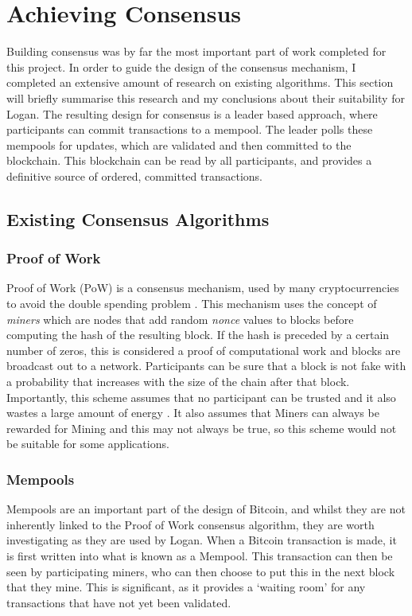 \documentclass[12pt,a4paper,twoside,openright]{report}
\begin{document}
	\section{Achieving Consensus}\label{sec:consensus}
	Building consensus was by far the most important part of work completed for this project. 
	In order to guide the design of the consensus mechanism, I completed an extensive amount of research on existing algorithms.
	This section will briefly summarise this research and my conclusions about their suitability for Logan. 
	The resulting design for consensus is a leader based approach, where participants can commit transactions to a mempool.
	The leader polls these mempools for updates, which are validated and then committed to the blockchain.
	This blockchain can be read by all participants, and provides a definitive source of ordered, committed transactions.

	\subsection{Existing Consensus Algorithms}
	\subsubsection*{Proof of Work}
	Proof of Work (PoW) is a consensus mechanism, used by many cryptocurrencies to avoid the double spending problem \cite{Bitcoin}. 
	This mechanism uses the concept of \textit{miners} which are nodes that add random \textit{nonce} values to blocks before computing the hash of the resulting block.
	If the hash is preceded by a certain number of zeros, this is considered a proof of computational work and blocks are broadcast out to a network.
	Participants can be sure that a block is not fake with a probability that increases with the size of the chain after that block. \\

	Importantly, this scheme assumes that no participant can be trusted 
	and it also wastes a large amount of energy \cite{BitcoinEnergy}.
	It also assumes that Miners can always be rewarded for Mining and this may not always be true, so this scheme would not be suitable for some applications.
	
	\subsubsection*{Mempools}
	Mempools are an important part of the design of Bitcoin, and whilst they are not inherently linked to the Proof of Work consensus algorithm, they are worth investigating as they are used by Logan.
	When a Bitcoin transaction is made, it is first written into what is known as a Mempool. 
	This transaction can then be seen by participating miners, who can then choose to put this in the next block that they mine. 
	This is significant, as it provides a `waiting room' for any transactions that have not yet been validated.  
\end{document}
